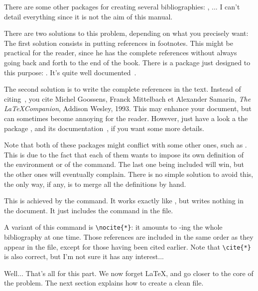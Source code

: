 There are some other packages for creating several bibliographies: 
, ... I can't detail everything since it is
not the aim of this manual.



There are two solutions to this problem, depending on what you
precisely want:  The first solution consists in putting references in
footnotes. This might be practical for the reader, since he has the
complete references without always going back and forth to the end of
the book. There is a package just designed to this purpose:
. It's quite well documented~\cite{footbib}.


The second solution is to write the complete references in the
text. Instead of citing~\cite{latex:lc}, you cite
Michel Goossens, Franck Mittelbach et Alexander
     Samarin, \emph{The \LaTeX Companion}, Addison Wesley, 1993. 
This may enhance your document, but can sometimes become
annoying for the reader. However, just have a look a the package , and
its documentation~\cite{bibentry}, if you want some more details.


Note that both of these packages might conflict with some other ones,
such as . This is due to the fact that each of them
wants to impose its own definition of the 
environment or of the  command. The last one being included
will win, but the other ones will eventually complain. There is no 
simple solution to avoid this, the only way, if any, is to merge all
the definitions by hand.



This is achieved by the  command. It works exactly like
, but writes nothing in the document. It just includes the
 command in the  file.


A variant of this command is \verb+\nocite{*}+: it 
amounts to -ing the whole bibliography at one time. 
Those references are included in the same order as they appear in the
 file, except for those having been cited earlier.
Note that \verb+\cite{*}+ is also correct, but I'm not sure it has 
any interest...


\bigskip


Well... That's all for this part. 
We now forget \LaTeX, and go closer to the core of the problem. The
next section explains how to create a clean  file.


